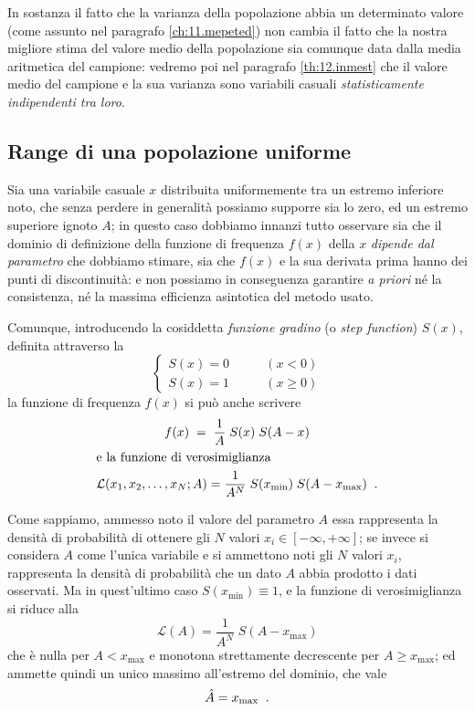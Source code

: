 In sostanza il fatto che la varianza della popolazione abbia
un determinato valore (come assunto nel paragrafo
\ref{ch:11.mepeted}) non cambia il fatto che la nostra
migliore stima del valore medio della popolazione sia
comunque data dalla media aritmetica del campione: vedremo
poi nel paragrafo \ref{th:12.inmest} che il valore medio del
campione e la sua varianza sono variabili casuali
\emph{statisticamente indipendenti tra loro}.%
%

\subsection{Range di una popolazione uniforme}%
Sia una variabile casuale $x$ distribuita uniformemente tra
un estremo inferiore noto, che senza perdere in generalit\`a
possiamo supporre sia lo zero, ed un estremo superiore
ignoto $A$; in questo caso dobbiamo innanzi tutto osservare
sia che il dominio di definizione della funzione di
frequenza $f(x)$ della $x$ \emph{dipende dal parametro} che
dobbiamo stimare, sia che $f(x)$ e la sua derivata prima
hanno dei punti di discontinuit\`a: e non possiamo in
conseguenza garantire \emph{a priori} n\'e la consistenza,
n\'e la massima efficienza asintotica del metodo usato.

Comunque, introducendo la cosiddetta \emph{funzione gradino}
(o \emph{step function}) $S(x)$, definita attraverso la
\begin{equation*}
  \begin{cases}
    S(x) = 0 &\qquad(x < 0) \\[1ex]
    S(x) = 1 &\qquad(x \ge 0)
  \end{cases}
\end{equation*}
la funzione di frequenza $f(x)$ si pu\`o anche scrivere
\begin{gather*}
  f(x) \; = \; \frac{1}{A} \; S(x) \; S(A - x) \\
  \intertext{e la funzione di verosimiglianza}
  \mathcal{L}(x_1, x_2, \ldots, x_N; A) = \frac{1}{A^N}
  \; S(x_{\min}) \; S(A - x_{\max}) \peq .
\end{gather*}

Come sappiamo, ammesso noto il valore del parametro $A$ essa
rappresenta la densit\`a di probabilit\`a di ottenere gli
$N$ valori $x_i \in [-\infty , +\infty]$; se invece si
considera $A$ come l'unica variabile e si ammettono noti gli
$N$ valori $x_i$, rappresenta la densit\`a di probabilit\`a
che un dato $A$ abbia prodotto i dati osservati.  Ma in
quest'ultimo caso $S(x_{\min}) \equiv 1$, e la funzione di
verosimiglianza si riduce alla
\begin{equation} \label{eq:11.range1}
  \mathcal{L}(A) = \frac{1}{A^N} \; S(A - x_{\max})
\end{equation}
che \`e nulla per $A < x_{\max}$ e monotona strettamente
decrescente per $A \ge x_{\max}$; ed ammette quindi un unico
massimo all'estremo del dominio, che vale
\begin{equation} \label{eq:11.range2}
  \hat A = x_{\max} \;\; .
\end{equation}

